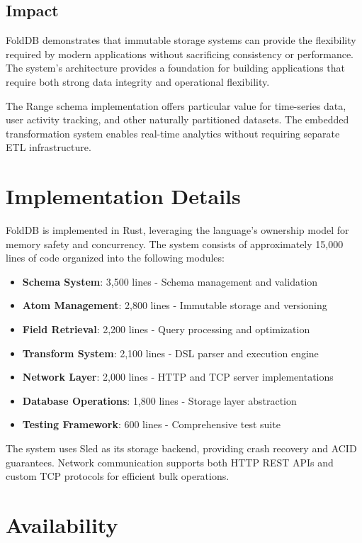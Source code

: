 \documentclass[11pt,a4paper]{article}
\begin{document}
\subsection{Impact}

FoldDB demonstrates that immutable storage systems can provide the flexibility required by modern applications without sacrificing consistency or performance. The system's architecture provides a foundation for building applications that require both strong data integrity and operational flexibility.

The Range schema implementation offers particular value for time-series data, user activity tracking, and other naturally partitioned datasets. The embedded transformation system enables real-time analytics without requiring separate ETL infrastructure.

\section{Implementation Details}

FoldDB is implemented in Rust, leveraging the language's ownership model for memory safety and concurrency. The system consists of approximately 15,000 lines of code organized into the following modules:

\begin{itemize}
\item \textbf{Schema System}: 3,500 lines - Schema management and validation
\item \textbf{Atom Management}: 2,800 lines - Immutable storage and versioning
\item \textbf{Field Retrieval}: 2,200 lines - Query processing and optimization
\item \textbf{Transform System}: 2,100 lines - DSL parser and execution engine
\item \textbf{Network Layer}: 2,000 lines - HTTP and TCP server implementations
\item \textbf{Database Operations}: 1,800 lines - Storage layer abstraction
\item \textbf{Testing Framework}: 600 lines - Comprehensive test suite
\end{itemize}

The system uses Sled as its storage backend, providing crash recovery and ACID guarantees. Network communication supports both HTTP REST APIs and custom TCP protocols for efficient bulk operations.

\section{Availability}
\end{document}
